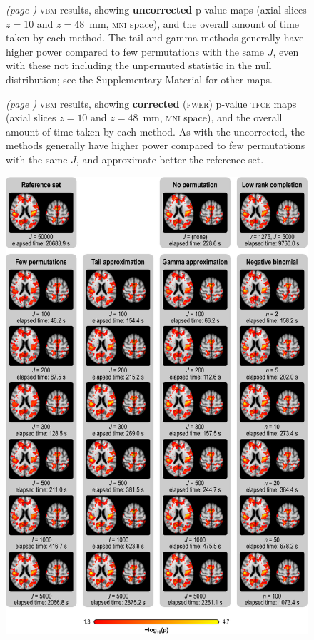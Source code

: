 \begin{figure}[!b]
\centering
\caption{\emph{(page \pageref{fig:vbm-vox-uncp_noref})} \textsc{vbm} results, showing \textbf{uncorrected} p-value maps (axial slices $z=10$ and $z=48$~mm, \textsc{mni} space), and the overall amount of time taken by each method. The tail and gamma methods generally have higher power compared to few permutations with the same $J$, even with these not including the unpermuted statistic in the null distribution; see the Supplementary Material for other maps.}
\label{fig:vbm-vox-uncp}
\end{figure}

\begin{figure}[!b]
\centering
\caption{\emph{(page \pageref{fig:vbm-tfce-fwep_noref})} \textsc{vbm} results, showing \textbf{corrected} (\textsc{fwer}) p-value \textsc{tfce} maps (axial slices $z=10$ and $z=48$~mm, \textsc{mni} space), and the overall amount of time taken by each method. As with the uncorrected, the methods generally have higher power compared to few permutations with the same $J$, and approximate better the reference set.}
\label{fig:vbm-tfce-fwep}
\end{figure}

\begin{figure}[!p]
\centering
\includegraphics[height=\textheight]{figures/vbm-vox-uncp.pdf}
\label{fig:vbm-vox-uncp_noref}
\end{figure}

